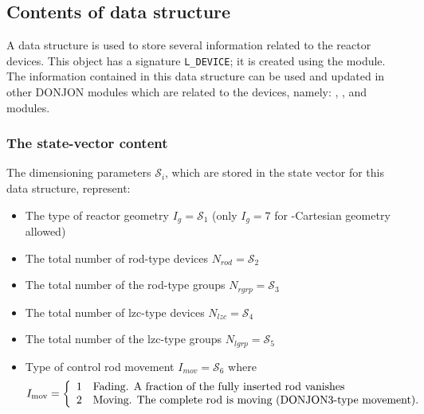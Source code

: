 \subsection{Contents of  data structure}\label{sect:device}

\vskip 0.2cm
A  data structure is used to store several information related
to the reactor devices. This object has a signature {\tt L\_DEVICE};
it is created using the  module. The information contained in
this data structure can be used and updated in other DONJON modules
which are related to the devices, namely: , ,
 and  modules.

\subsubsection{The state-vector content}\label{sect:devicestate}
\noindent
The dimensioning parameters $\mathcal{S}_i$, which are stored in the state
vector for this data structure, represent:

\begin{itemize}

\item The type of reactor geometry $I_g = \mathcal{S}_1$
(only $I_g=7$ for -Cartesian geometry allowed)

\item The total number of rod-type devices $N_{rod} = \mathcal{S}_2$

\item The total number of the rod-type groups $N_{rgrp} = \mathcal{S}_3$

\item The total number of lzc-type devices $N_{lzc} = \mathcal{S}_4$

\item The total number of the lzc-type groups $N_{lgrp} = \mathcal{S}_5$

\item Type of control rod movement $I_{mov} = \mathcal{S}_6$ where
\begin{displaymath}
I_{\rm mov} = \left\{
\begin{array}{rl}
 1 & \textrm{Fading. A fraction of the fully inserted rod vanishes} \\
 2 & \textrm{Moving. The complete rod is moving (DONJON3-type movement).}
\end{array} \right.
\end{displaymath}

\end{itemize}

